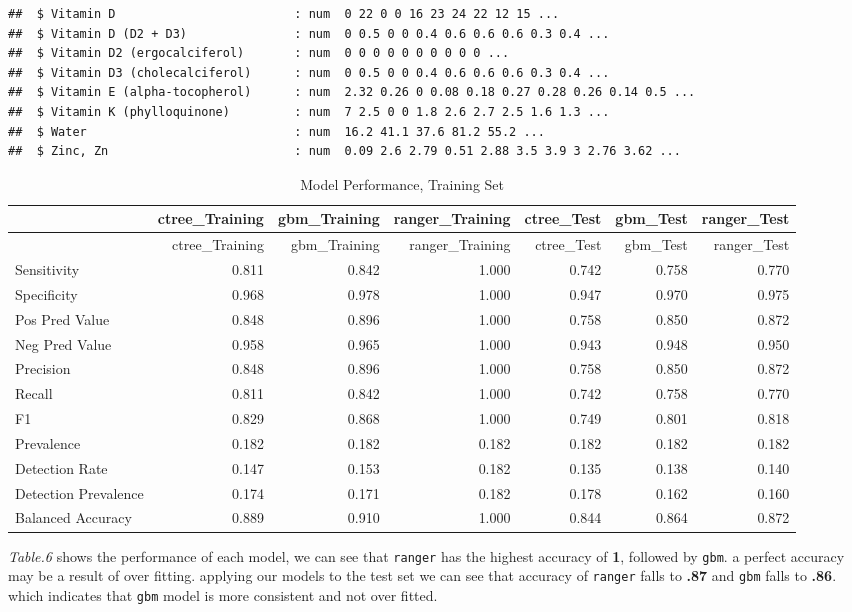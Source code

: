 \documentclass[]{article}
\begin{document}
\begin{verbatim}
##  $ Vitamin D                         : num  0 22 0 0 16 23 24 22 12 15 ...
##  $ Vitamin D (D2 + D3)               : num  0 0.5 0 0 0.4 0.6 0.6 0.6 0.3 0.4 ...
##  $ Vitamin D2 (ergocalciferol)       : num  0 0 0 0 0 0 0 0 0 0 ...
##  $ Vitamin D3 (cholecalciferol)      : num  0 0.5 0 0 0.4 0.6 0.6 0.6 0.3 0.4 ...
##  $ Vitamin E (alpha-tocopherol)      : num  2.32 0.26 0 0.08 0.18 0.27 0.28 0.26 0.14 0.5 ...
##  $ Vitamin K (phylloquinone)         : num  7 2.5 0 0 1.8 2.6 2.7 2.5 1.6 1.3 ...
##  $ Water                             : num  16.2 41.1 37.6 81.2 55.2 ...
##  $ Zinc, Zn                          : num  0.09 2.6 2.79 0.51 2.88 3.5 3.9 3 2.76 3.62 ...
\end{verbatim}

\newpage

\begin{longtable}[]{@{}lrrrrrr@{}}
\caption{Model Performance, Training Set}\tabularnewline
\toprule
& ctree\_Training & gbm\_Training & ranger\_Training & ctree\_Test &
gbm\_Test & ranger\_Test\tabularnewline
\midrule
\endfirsthead
\toprule
& ctree\_Training & gbm\_Training & ranger\_Training & ctree\_Test &
gbm\_Test & ranger\_Test\tabularnewline
\midrule
\endhead
Sensitivity & 0.811 & 0.842 & 1.000 & 0.742 & 0.758 &
0.770\tabularnewline
Specificity & 0.968 & 0.978 & 1.000 & 0.947 & 0.970 &
0.975\tabularnewline
Pos Pred Value & 0.848 & 0.896 & 1.000 & 0.758 & 0.850 &
0.872\tabularnewline
Neg Pred Value & 0.958 & 0.965 & 1.000 & 0.943 & 0.948 &
0.950\tabularnewline
Precision & 0.848 & 0.896 & 1.000 & 0.758 & 0.850 & 0.872\tabularnewline
Recall & 0.811 & 0.842 & 1.000 & 0.742 & 0.758 & 0.770\tabularnewline
F1 & 0.829 & 0.868 & 1.000 & 0.749 & 0.801 & 0.818\tabularnewline
Prevalence & 0.182 & 0.182 & 0.182 & 0.182 & 0.182 &
0.182\tabularnewline
Detection Rate & 0.147 & 0.153 & 0.182 & 0.135 & 0.138 &
0.140\tabularnewline
Detection Prevalence & 0.174 & 0.171 & 0.182 & 0.178 & 0.162 &
0.160\tabularnewline
Balanced Accuracy & 0.889 & 0.910 & 1.000 & 0.844 & 0.864 &
0.872\tabularnewline
\bottomrule
\end{longtable}

\emph{Table.6} shows the performance of each model, we can see that
\texttt{ranger} has the highest accuracy of \textbf{1}, followed by
\texttt{gbm}. a perfect accuracy may be a result of over fitting.
applying our models to the test set we can see that accuracy of
\texttt{ranger} falls to \textbf{.87} and \texttt{gbm} falls to
\textbf{.86}. which indicates that \texttt{gbm} model is more consistent
and not over fitted.
\end{document}

